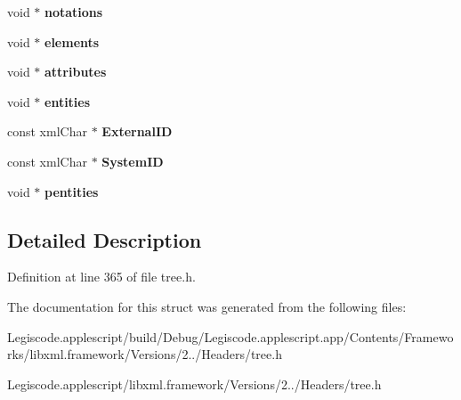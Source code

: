\begin{DoxyCompactItemize}
\item 
\hypertarget{struct__xml_dtd_a7b1a5c67208686bae414032e606597a2}{void $\ast$ {\bfseries notations}}\label{struct__xml_dtd_a7b1a5c67208686bae414032e606597a2}

\item 
\hypertarget{struct__xml_dtd_a27aaaa27624c73794e0dc19793929727}{void $\ast$ {\bfseries elements}}\label{struct__xml_dtd_a27aaaa27624c73794e0dc19793929727}

\item 
\hypertarget{struct__xml_dtd_acb03ef64b13d10880740d9281489c476}{void $\ast$ {\bfseries attributes}}\label{struct__xml_dtd_acb03ef64b13d10880740d9281489c476}

\item 
\hypertarget{struct__xml_dtd_a614c518b89ce0bed5677cb29ae6e6db6}{void $\ast$ {\bfseries entities}}\label{struct__xml_dtd_a614c518b89ce0bed5677cb29ae6e6db6}

\item 
\hypertarget{struct__xml_dtd_aea5fe5f6bcb04bd134c673b07b5d749e}{const xml\-Char $\ast$ {\bfseries External\-I\-D}}\label{struct__xml_dtd_aea5fe5f6bcb04bd134c673b07b5d749e}

\item 
\hypertarget{struct__xml_dtd_a929625de7d3ef6c92ec6380dbf90f0e0}{const xml\-Char $\ast$ {\bfseries System\-I\-D}}\label{struct__xml_dtd_a929625de7d3ef6c92ec6380dbf90f0e0}

\item 
\hypertarget{struct__xml_dtd_a772702228419a2a6b51a1393f2f0f010}{void $\ast$ {\bfseries pentities}}\label{struct__xml_dtd_a772702228419a2a6b51a1393f2f0f010}

\end{DoxyCompactItemize}


\subsection{Detailed Description}


Definition at line 365 of file tree.\-h.



The documentation for this struct was generated from the following files\-:\begin{DoxyCompactItemize}
\item 
Legiscode.\-applescript/build/\-Debug/\-Legiscode.\-applescript.\-app/\-Contents/\-Frameworks/libxml.\-framework/\-Versions/2../\-Headers/tree.\-h\item 
Legiscode.\-applescript/libxml.\-framework/\-Versions/2../\-Headers/tree.\-h\end{DoxyCompactItemize}
